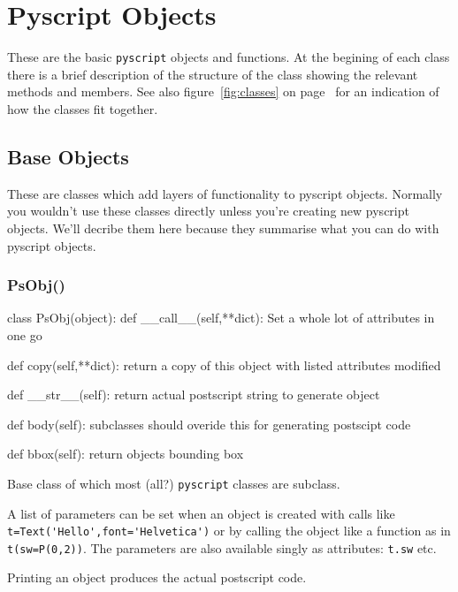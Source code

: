\documentclass[a4paper]{book}
\begin{document}
\chapter{Pyscript Objects}
\label{cha:base-objects}

These are the basic \Verb|pyscript| objects and functions. At the
begining of each class there is a brief description of the structure
of the class showing the relevant methods and members. See also
figure~\ref{fig:classes} on page~\pageref{fig:classes} for an
indication of how the classes fit together.

\section{Base Objects}

These are classes which add layers of functionality to pyscript objects.
Normally you wouldn't use these classes directly unless you're creating new 
pyscript objects. We'll decribe them here because they summarise what
you can do with pyscript objects.

\subsection{PsObj()}
\label{sec:psobj}
\begin{python}
class PsObj(object):
    def __call__(self,**dict):
        Set a whole lot of attributes in one go

    def copy(self,**dict):
        return a copy of this object
        with listed attributes modified

    def __str__(self):
        return actual postscript string to generate object

    def body(self):
        subclasses should overide this for generating postscipt code

    def bbox(self):
        return objects bounding box
\end{python}

Base class of which most (all?) \Verb|pyscript| classes are subclass.

A list of parameters can be set when an object is created with
calls like \Verb|t=Text('Hello',font='Helvetica')|
or by calling the object like a function as in \Verb|t(sw=P(0,2))|.
The parameters are also available singly as attributes: \Verb|t.sw| etc.

Printing an object produces the actual postscript code.
\end{document}
